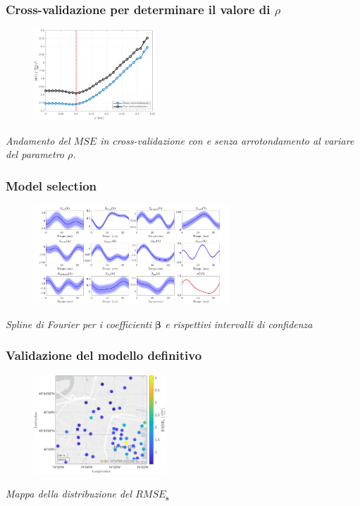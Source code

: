 \begin{frame}
	\frametitle{Cross-validazione per determinare il valore di $\rho$}
	\centering
	\begin{figure}
		\includegraphics[height=130px]{../Tesi/Immagini/4. Caso di studio/Cross_validazione/MSE_rho_full_focus}
	\end{figure}
	\vspace{-10pt}
	\textit{Andamento del $MSE$ in cross-validazione con e senza arrotondamento al variare del parametro $\rho$.}
\end{frame}

\begin{frame}
	\frametitle{Model selection}
	\centering
	\begin{figure}
		\includegraphics[height=140px]{../Tesi/Immagini/4. Caso di studio/Model selection/Trend spline, rho=100m}
	\end{figure}
	\vspace{-10pt}
	\textit{Spline di Fourier per i coefficienti $\boldsymbol{\beta}$ e rispettivi intervalli di confidenza}
\end{frame}

\begin{frame}
	\frametitle{Validazione del modello definitivo}
	\centering
	
	\begin{figure}
		\includegraphics[height=140px]{../Tesi/Immagini/4. Caso di studio/LOOCV/RMSE_s}
	\end{figure}
	\vspace{-10pt}
	\textit{Mappa della distribuzione del $RMSE_\mathbf{s}$}
\end{frame}

